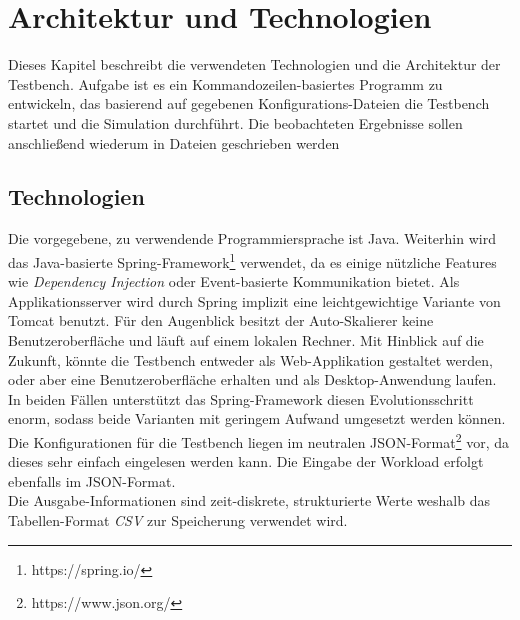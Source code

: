 \chapter{Architektur und Technologien}
\label{ch:Architektur und Technologien}
Dieses Kapitel beschreibt die verwendeten Technologien und die Architektur der Testbench. Aufgabe ist es ein Kommandozeilen-basiertes Programm zu entwickeln, das basierend auf gegebenen Konfigurations-Dateien die Testbench startet und die Simulation durchführt. Die beobachteten Ergebnisse sollen anschließend wiederum in Dateien geschrieben werden



\section{Technologien}
\label{sec:Architektur und Technologien:Technologien}
Die vorgegebene, zu verwendende Programmiersprache ist Java. Weiterhin wird das Java-basierte Spring-Framework\footnote{https://spring.io/} verwendet, da es einige nützliche Features wie \textit{Dependency Injection} oder Event-basierte Kommunikation bietet. Als Applikationsserver wird durch Spring implizit eine leichtgewichtige Variante von Tomcat benutzt. Für den Augenblick besitzt der Auto-Skalierer keine Benutzeroberfläche und läuft auf einem lokalen Rechner. Mit Hinblick auf die Zukunft, könnte die Testbench entweder als Web-Applikation gestaltet werden, oder aber eine Benutzeroberfläche erhalten und als Desktop-Anwendung laufen. In beiden Fällen unterstützt das Spring-Framework diesen Evolutionsschritt enorm, sodass beide Varianten mit geringem Aufwand umgesetzt werden können. \\
Die Konfigurationen für die Testbench liegen im neutralen JSON-Format\footnote{https://www.json.org/} vor, da dieses sehr einfach eingelesen werden kann. Die Eingabe der Workload erfolgt ebenfalls im JSON-Format. \\
Die Ausgabe-Informationen sind zeit-diskrete, strukturierte Werte weshalb das Tabellen-Format \textit{CSV} zur Speicherung verwendet wird.


